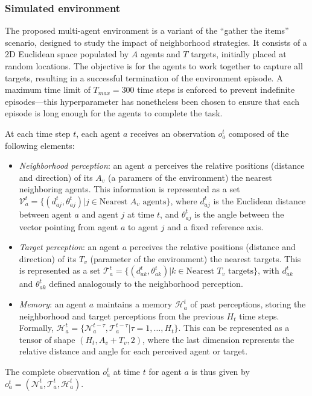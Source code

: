 \subsubsection{Simulated environment}
The proposed multi-agent environment is a variant of the ``gather the items'' scenario, 
 designed to study the impact of neighborhood strategies. 
%
It consists of a 2D Euclidean space populated by $A$ agents and $T$ targets, 
 initially placed at random locations.
%
The objective is for the agents to work together to capture all targets, 
 resulting in a successful termination of the environment episode.
%
A maximum time limit of $T_{max} = 300$ time steps is enforced to prevent indefinite 
 episodes---this hyperparameter has nonetheless been chosen to ensure that each episode is long enough for the agents to complete the task.

At each time step $t$, 
 each agent $a$ receives an observation $o_a^t$ composed of the following elements:
\begin{itemize}
  \item \emph{Neighborhood perception}: an agent $a$ perceives the relative positions (distance and direction) 
   of its $A_v$ (a paramers of the environment) the nearest neighboring agents. 
   This information is represented as a set $\mathcal{V}_a^t = \{(d_{aj}^t, \theta_{aj}^t) | j \in \text{Nearest } A_v \text{ agents}\}$, 
   where $d_{aj}^t$ is the Euclidean distance between agent $a$ and agent $j$ at time $t$, 
   and $\theta_{aj}^t$ is the angle between the vector pointing from agent $a$ to agent $j$ and a fixed reference axis.
  \item \emph{Target perception}: an agent $a$ perceives the relative positions (distance and direction) 
   of its $T_v$ (parameter of the environment) the nearest targets. 
  This is represented as a set $\mathcal{T}_a^t = \{(d_{ak}^t, \theta_{ak}^t) | k \in \text{Nearest } T_v \text{ targets}\}$, with $d_{ak}^t$ 
   and $\theta_{ak}^t$ defined analogously to the neighborhood perception.
  \item \emph{Memory}: an agent $a$ maintains a memory $\mathcal{H}_a^t$ of past perceptions, 
   storing the neighborhood and target perceptions from the previous $H_t$ time steps. 
  Formally, $\mathcal{H}_a^t = \{\mathcal{N}_a^{t-\tau}, \mathcal{T}_a^{t-\tau} | \tau = 1, \dots, H_t\}$. 
  This can be represented as a tensor of shape $(H_t, A_v + T_v, 2)$, 
   where the last dimension represents the relative distance and angle for each perceived agent or target.
\end{itemize}
The complete observation $o_a^t$ at time $t$ for agent $a$ is thus given by $o_a^t = (\mathcal{N}_a^t, \mathcal{T}_a^t, \mathcal{H}_a^t)$.

